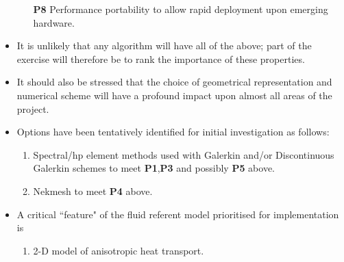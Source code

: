 \begin{itemize}
\begin{itemize}
\item[{\bf P8}] Performance portability to allow rapid deployment upon emerging hardware.
\end{itemize}

\item It is unlikely that any algorithm will have all of the above; part of the exercise
will therefore be to rank the importance of these properties.


\item It should also be stressed that 
the choice of geometrical representation and numerical 
scheme will have a profound impact upon
almost all areas of the project.


\item Options have been tentatively 
identified for initial investigation as
follows:
\begin{enumerate}
\item Spectral/hp element methods
used with Galerkin and/or Discontinuous Galerkin schemes
to meet {\bf P1},{\bf P3} and possibly {\bf P5} above.
\item Nekmesh to meet {\bf P4} above.
\end{enumerate}

\item A critical ``feature" of the fluid referent model prioritised for implementation is
\begin{enumerate}
\item 2-D model of anisotropic heat transport.
\end{enumerate}
\end{itemize}

